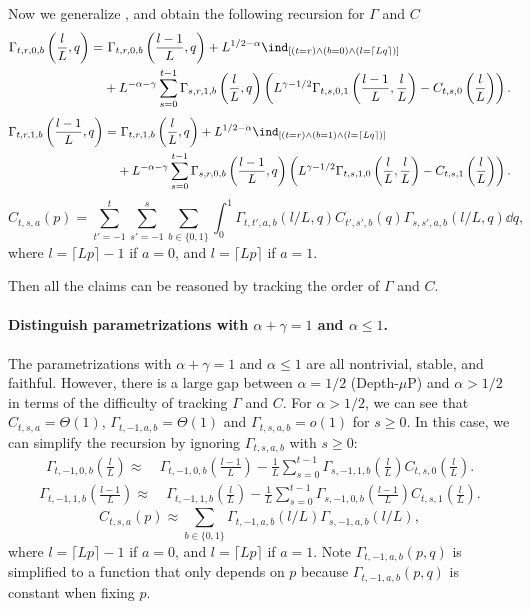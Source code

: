 Now we generalize , and obtain the following recursion for $\Gamma$ and $C$
\begin{align*} 
     \Gamma_{t,r,0,b}\left(\frac l L, q\right) = &~\Gamma_{t,r,0,b}\left(\frac{l-1}L, q\right) + L^{1/2-\alpha}\ind_{[(t=r) \wedge (b=0) \wedge (l=\lceil L q\rceil)]} \\
     & + L^{-\alpha-\gamma} \sum_{s=0}^{t-1} \Gamma_{s,r,1,b}\left(\frac l L, q\right)\left(L^{\gamma-1/2}\Gamma_{t,s,0,1}\left(\frac{l-1}L, \frac l L\right)-C_{t,s,0}\left(\frac l L\right)\right).
    \end{align*}
    \begin{align*} 
     \Gamma_{t,r,1,b}\left(\frac {l-1} L, q\right) = &~\Gamma_{t,r,1,b}\left(\frac{l}L, q\right) + L^{1/2-\alpha} \ind_{[(t=r) \wedge (b=1) \wedge (l=\lceil L q\rceil)]} \\
     & + L^{-\alpha-\gamma} \sum_{s=0}^{t-1} \Gamma_{s,r,0,b}\left(\frac {l-1} L, q\right)\left(L^{\gamma -1/2}\Gamma_{t,s,1,0}\left(\frac{l}L, \frac l L\right)-C_{t,s,1}\left(\frac l L\right)\right).
     \end{align*}
     \[C_{t,s,a}(p)=\sum_{t'=-1}^{t}\sum_{s'=-1}^{s}\sum_{b\in\{0,1\}}\int_0^1 \Gamma_{t,t',a,b}(l/L,q) C_{t',s',b}(q)\Gamma_{s,s',a,b}(l/L,q) \dd q,\] where $l=\lceil Lp\rceil -1$ if $a=0$, and  $l=\lceil Lp\rceil$ if $a=1$.

Then all the claims can be reasoned by tracking the order of $\Gamma$ and $C$.
\paragraph{Distinguish parametrizations with $\alpha+\gamma=1$ and $\alpha\leq 1$. } The parametrizations with $\alpha+\gamma=1$ and $\alpha\leq 1$ are all nontrivial, stable, and faithful. However, there is a large gap between $\alpha=1/2$ (Depth-$\mu$P) and $\alpha > 1/2$ in terms of the difficulty of tracking $\Gamma$ and $C$. For $\alpha > 1/2$, we can see that
$C_{t,s,a}=\Theta(1)$, $\Gamma_{t,-1,a,b}=\Theta(1)$ and $\Gamma_{t,s,a,b}=o(1)$ for $s\geq 0$. In this case, we can simplify the recursion by ignoring $\Gamma_{t,s,a,b}$ with $s\geq 0$: 
\begin{align*} 
     \Gamma_{t,-1,0,b}\left(\frac l L\right) \approx &~\Gamma_{t,-1,0,b}\left(\frac{l-1}L\right) - \frac1L \sum_{s=0}^{t-1} \Gamma_{s,-1,1,b}\left(\frac l L\right)C_{t,s,0}\left(\frac l L\right).
    \end{align*}
    \begin{align*} 
     \Gamma_{t,-1,1,b}\left(\frac {l-1} L\right) \approx &~\Gamma_{t,-1,1,b}\left(\frac{l}L\right)  - \frac1L \sum_{s=0}^{t-1} \Gamma_{s,-1,0,b}\left(\frac {l-1} L\right)C_{t,s,1}\left(\frac l L\right).
     \end{align*}
     \[C_{t,s,a}(p)\approx\sum_{b\in\{0,1\}} \Gamma_{t,-1,a,b}(l/L) \Gamma_{s,-1,a,b}(l/L),\] where $l=\lceil Lp\rceil -1$ if $a=0$, and  $l=\lceil Lp\rceil$ if $a=1$. Note $\Gamma_{t,-1,a,b}(p,q)$ is simplified to a function that only depends on $p$ because $\Gamma_{t,-1, a,b}(p, q)$ is constant when fixing $p$. 

